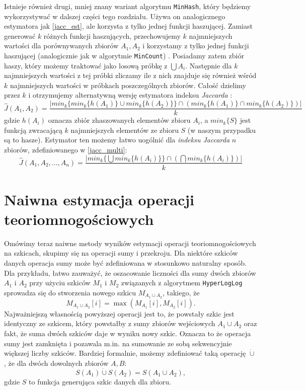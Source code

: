 Istnieje również drugi, mniej znany wariant algorytmu \texttt{MinHash}, który będziemy wykorzystywać w dalszej części tego rozdziału.
 Używa on analogicznego estymatora jak \ref{jacc_est}, ale korzysta z tylko jednej funkcji haszującej. Zamiast generować $k$ różnych funkcji haszujących, przechowujemy $k$ najmniejszych wartości dla porównywanych zbiorów $A_1, A_2$ i korzystamy z tylko jednej funkcji haszującej (analogicznie jak w algorytmie \texttt{MinCount}) \cite{adroll}. Posiadamy zatem zbiór haszy, który możemy traktować jako losową próbkę z $\bigcup A_i$. Następnie dla $k$ najmniejszych wartości z tej próbki zliczamy ile z nich znajduje się również wśród $k$ najmniejszych wartości w próbkach poszczególnych zbiorów. Całość dzielimy przez $k$ i otrzymujemy alternatywną wersję estymatora indeksu \textit{Jaccarda} \cite{adroll}:
 \begin{equation}
 \hat{J}(A_1, A_2) = \frac{|min_{k}\{min_{k} \{ h(A_1) \} \cup min_{k} \{ h(A_2) \} \} \cap (min_{k}\{h(A_1)\} \cap min_{k}\{h(A_2)\})|}{k}
 \end{equation}
 gdzie $h(A_i)$ oznacza zbiór zhaszowanych elementów zbioru $A_i$, a $min_{k}\{S\}$ jest funkcją zwracającą $k$ najmniejszych elementów ze zbioru $S$ (w naszym przypadku są to hasze).
 Estymator ten możemy łatwo uogólnić dla \textit{indeksu Jaccarda} $n$ zbiorów, zdefiniowanego w \ref{jacc_multi}:
\begin{equation}
    \hat{J}(A_1, A_2, ..., A_n) = \frac{|min_{k}\{\bigcup min_{k} \{ h(A_i) \} \} \cap (\bigcap min_{k}\{h(A_i)\})|}{k}
\end{equation}

\section{Naiwna estymacja operacji teoriomnogościowych}
\label{naive_est}

Omówimy teraz naiwne metody wyników estymacji operacji teoriomnogościowych na szkicach, skupimy się na operacji sumy i przekroju. Dla niektóre szkiców danych operacja sumy może być zdefiniowana w stosunkowo naturalny sposób. Dla przykładu, łatwo zauważyć, że  oszacowanie liczności dla sumy dwóch zbiorów $A_1$ i $A_2$ przy użyciu szkiców $M_1$ i $M_2$ związanych z algorytmem \texttt{HyperLogLog} sprowadza się do stworzenia nowego szkicu $M_{A_1\cup A_2}$, takiego, że 
$$M_{A_1\cup A_2}[i] = \max(M_{A_1}[i], M_{A_2}[i]).$$ 
Najważniejszą własnością powyższej operacji jest to, że powstały szkic jest identyczny ze szkicem, który powstałby z sumy zbiorów wejściowych $A_1\cup A_2$ oraz fakt, że suma dwóch szkiców daje w wyniku nowy szkic. Oznacza to że operacja sumy jest zamknięta i pozawala m.in. na sumowanie ze sobą sekwencyjnie większej liczby szkiców.
Bardziej formalnie, możemy zdefiniować taką operację $\dot{\cup}$, że dla dwóch dowolnych zbiorów $A, B$:
\begin{equation}
    S(A_1) \dot{\cup} S(A_2) = S(A_1 \cup A_2),
\end{equation}
gdzie $S$ to funkcja generująca szkic danych dla zbioru.

